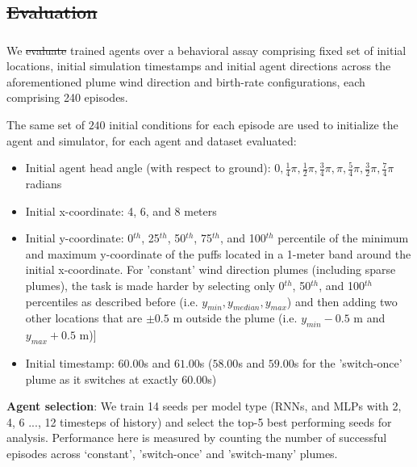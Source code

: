\documentclass[5p,twocolumn,authoryear]{elsarticle}
\providecommand{\DIFaddtex}[1]{{\protect\color{blue}\uwave{#1}}} %
\providecommand{\DIFdeltex}[1]{{\protect\color{red}\sout{#1}}}                      %
\providecommand{\DIFaddbegin}{} %
\providecommand{\DIFaddend}{} %
\providecommand{\DIFdelbegin}{} %
\providecommand{\DIFdelend}{} %
\providecommand{\DIFadd}[1]{\texorpdfstring{\DIFaddtex{#1}}{#1}} %
\providecommand{\DIFdel}[1]{\texorpdfstring{\DIFdeltex{#1}}{}} %
\newcommand{\DIFscaledelfig}{0.5}
\newlength{\DIFdelgraphicswidth} %
\newlength{\DIFdelgraphicsheight} %
\newcommand{\DIFaddincludegraphics}[2][]{{\color{blue}\fbox{\DIFOincludegraphics[#1]{#2}}}} %
\newcommand{\DIFdelincludegraphics}[2][]{%
\sbox{\DIFdelgraphicsbox}{\DIFOincludegraphics[#1]{#2}}%
\settoboxwidth{\DIFdelgraphicswidth}{\DIFdelgraphicsbox} %
\settoboxtotalheight{\DIFdelgraphicsheight}{\DIFdelgraphicsbox} %
\scalebox{\DIFscaledelfig}{%
\parbox[b]{\DIFdelgraphicswidth}{\usebox{\DIFdelgraphicsbox}\\[-\baselineskip] \rule{\DIFdelgraphicswidth}{0em}}\llap{\resizebox{\DIFdelgraphicswidth}{\DIFdelgraphicsheight}{%
\setlength{\unitlength}{\DIFdelgraphicswidth}%
\begin{picture}(1,1)%
\thicklines\linethickness{2pt} %
{\color[rgb]{1,0,0}\put(0,0){\framebox(1,1){}}}%
{\color[rgb]{1,0,0}\put(0,0){\line( 1,1){1}}}%
{\color[rgb]{1,0,0}\put(0,1){\line(1,-1){1}}}%
\end{picture}%
}\hspace*{3pt}}} %
} %
\DeclareRobustCommand{\DIFaddbegin}{\DIFOaddbegin \let\includegraphics\DIFaddincludegraphics} %
\DeclareRobustCommand{\DIFaddend}{\DIFOaddend \let\includegraphics\DIFOincludegraphics} %
\DeclareRobustCommand{\DIFdelbegin}{\DIFOdelbegin \let\includegraphics\DIFdelincludegraphics} %
\DeclareRobustCommand{\DIFdelend}{\DIFOaddend \let\includegraphics\DIFOincludegraphics} %
\begin{document}
\DIFdelbegin \subsection{\DIFdel{Evaluation}}
\addtocounter{subsection}{-1}%
\DIFdelend \DIFaddbegin \subsubsection{\DIFadd{Evaluation}}
\DIFaddend \label{sec_supp_eval}
We \DIFdelbegin \DIFdel{evaluate }\DIFdelend \DIFaddbegin \DIFadd{evaluated }\DIFaddend trained agents over a behavioral assay comprising fixed set of initial locations, initial simulation timestamps and initial agent directions across the aforementioned plume wind direction and birth-rate configurations, each comprising 240 episodes.

The same set of $240$ initial conditions for each episode are used to initialize the agent and simulator, for each agent and dataset evaluated: 
\begin{itemize}
    \item Initial agent head angle (with respect to ground): $0, \frac{1}{4}\pi, \frac{1}{2}\pi, \frac{3}{4}\pi, \pi, \frac{5}{4}\pi, \frac{3}{2}\pi, \frac{7}{4}\pi$ radians
    \item Initial x-coordinate: 4, 6, and 8 meters
    \item Initial y-coordinate: 0$^{th}$, 25$^{th}$, 50$^{th}$, 75$^{th}$, and 100$^{th}$ percentile of the minimum and maximum y-coordinate of the puffs located in a 1-meter band around the initial x-coordinate. 
    For 'constant'  wind direction plumes (including sparse plumes), the task is made harder by selecting only 0$^{th}$, 50$^{th}$, and 100$^{th}$ percentiles as described before (i.e. $y_{min}, y_{median}, y_{max}$) and then adding two other locations that are $\pm 0.5$ m outside the plume (i.e. $y_{min} - 0.5$ m and $y_{max} + 0.5$ m)]
    \item Initial timestamp: $60.00$s and $61.00$s ($58.00$s and $59.00$s for the 'switch-once' plume as it switches at exactly $60.00$s)
\end{itemize}

\textbf{Agent selection}:  We train 14 seeds per model type (RNNs, and MLPs with 2, 4, 6 ..., 12 timesteps of history) and select the top-5 best performing seeds for analysis.
Performance here is measured by counting the number of successful episodes across `constant', 'switch-once' and 'switch-many' plumes. \\ 
\end{document}
